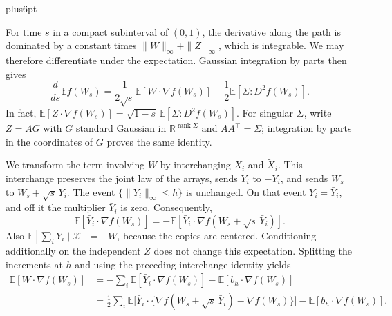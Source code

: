 \documentclass[11pt,letterpaper,twoside,leqno]{article}
\makeatletter
\theoremstyle{bookplain}
\theoremstyle{bookremark}
\renewenvironment{proof}[1][\proofname]{\par
  \pushQED{\qed}\normalfont\topsep6pt plus6pt\relax
  \trivlist\item[\hskip\labelsep\bfseries #1\@addpunct{.}]\ignorespaces
}{\popQED\endtrivlist\@endpefalse}
\newcommand{\E}{\mathbb E}
\newcommand{\R}{\mathbb R}
\makeatother
\begin{document}
\begin{proof}
For time $s$ in a compact subinterval of $(0,1)$, the derivative
along the path is dominated by a constant times $\|W\|_\infty+\|Z\|_\infty$,
which is integrable. We may therefore differentiate under the
expectation. Gaussian integration by parts then gives
\begin{equation}\label{ben:slepian-initial}
 \frac d{ds}\E f(W_s)
 =\frac1{2\sqrt s}\E[W\cdot\nabla f(W_s)]
       -\frac12\E[\Sigma:D^2f(W_s)].
\end{equation}
In fact,
$\E[Z\cdot\nabla f(W_s)]
=\sqrt{1-s}\,\E[\Sigma:D^2f(W_s)]$.
For singular $\Sigma$, write $Z=AG$ with $G$ standard Gaussian
in $\R^{\operatorname{rank}\Sigma}$ and $AA^\top=\Sigma$;
integration by parts in the coordinates of $G$ proves the same identity.

We transform the term involving $W$ by interchanging $X_i$ and
$\widetilde X_i$. This interchange preserves the joint law of
the arrays, sends $Y_i$ to $-Y_i$, and sends $W_s$ to
$W_s+\sqrt s\,Y_i$. The event $\{\|Y_i\|_\infty\le h\}$
is unchanged. On that event $Y_i=\bar Y_i$, and off it the
multiplier $\bar Y_i$ is zero. Consequently,
\[
 \E[\bar Y_i\cdot\nabla f(W_s)]
 =-\E[\bar Y_i\cdot\nabla f(W_s+\sqrt s\,\bar Y_i)].
\]
Also $\E[\sum_iY_i\mid\mathcal X]=-W$, because the copies
are centered. Conditioning additionally on the independent $Z$
does not change this expectation. Splitting the increments at $h$
and using the preceding interchange identity yields
\begin{align*}
 \E[W\cdot\nabla f(W_s)]
 &=-\sum_i\E[\bar Y_i\cdot\nabla f(W_s)]
       -\E[b_h\cdot\nabla f(W_s)]\\
 &=\frac12\sum_i\E\big[\bar Y_i\cdot
       \{\nabla f(W_s+\sqrt s\,\bar Y_i)-\nabla f(W_s)\}\big]
       -\E[b_h\cdot\nabla f(W_s)].
\end{align*}


\end{proof}
\end{document}
